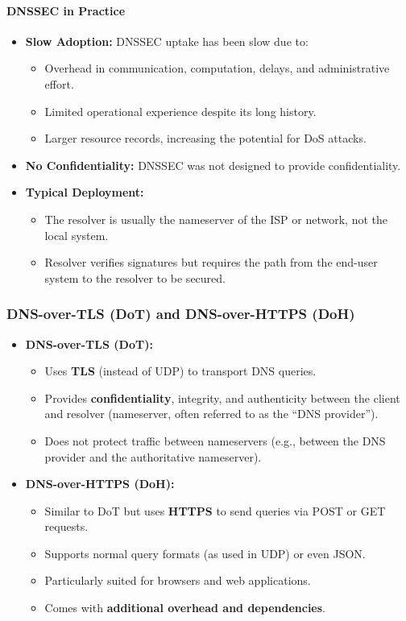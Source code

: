 \paragraph{DNSSEC in Practice}
\begin{itemize}
    \item \textbf{Slow Adoption:} DNSSEC uptake has been slow due to:
    \begin{itemize}
        \item Overhead in communication, computation, delays, and administrative effort.
        \item Limited operational experience despite its long history.
        \item Larger resource records, increasing the potential for DoS attacks.
    \end{itemize}
    \item \textbf{No Confidentiality:} DNSSEC was not designed to provide confidentiality.
    \item \textbf{Typical Deployment:}
    \begin{itemize}
        \item The resolver is usually the nameserver of the ISP or network, not the local system.
        \item Resolver verifies signatures but requires the path from the end-user system to the resolver to be secured.
    \end{itemize}
\end{itemize}
\subsubsection{DNS-over-TLS (DoT) and DNS-over-HTTPS (DoH)}
\begin{itemize}
    \item \textbf{DNS-over-TLS (DoT):}
    \begin{itemize}
        \item Uses \textbf{TLS} (instead of UDP) to transport DNS queries.
        \item Provides \textbf{confidentiality}, integrity, and authenticity between the client and resolver (nameserver, often referred to as the ``DNS provider'').
        \item Does not protect traffic between nameservers (e.g., between the DNS provider and the authoritative nameserver).
    \end{itemize}
    \item \textbf{DNS-over-HTTPS (DoH):}
    \begin{itemize}
        \item Similar to DoT but uses \textbf{HTTPS} to send queries via POST or GET requests.
        \item Supports normal query formats (as used in UDP) or even JSON.
        \item Particularly suited for browsers and web applications.
        \item Comes with \textbf{additional overhead and dependencies}.
    \end{itemize}
\end{itemize}
